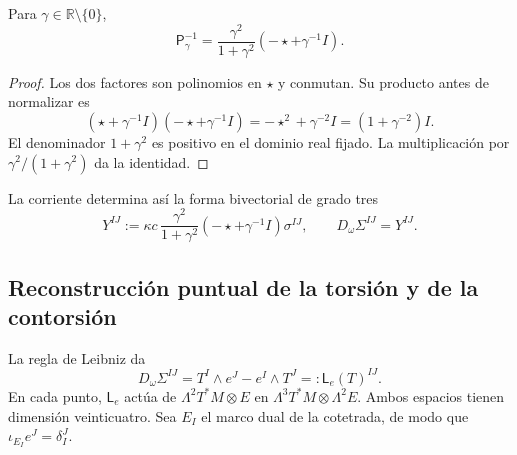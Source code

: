 \begin{lemma}
\label{vii:vii:lem:inversa-holst}
Para \(\gamma\in\mathbb R\setminus\{0\}\),
\begin{equation}
 \mathsf P_\gamma^{-1}
 =\frac{\gamma^2}{1+\gamma^2}
                      (-\star+\gamma^{-1}I).
 \label{vii:vii:eq:inversa-holst}
\end{equation}
\end{lemma}
\begin{proof}
Los dos factores son polinomios en \(\star\) y conmutan. Su producto
antes de normalizar es
\[
 (\star+\gamma^{-1}I)(-\star+\gamma^{-1}I)
 =-\star^2+\gamma^{-2}I=(1+\gamma^{-2})I.
\]
El denominador \(1+\gamma^2\) es positivo en el dominio real fijado.
La multiplicación por \(\gamma^2/(1+\gamma^2)\) da la identidad.
\end{proof}

La corriente determina así la forma bivectorial de grado tres
\begin{equation}
 Y^{IJ}:=\kappa c\,
   \frac{\gamma^2}{1+\gamma^2}
   (-\star+\gamma^{-1}I)\sigma^{IJ},
 \qquad D_\omega\Sigma^{IJ}=Y^{IJ}.
 \label{vii:vii:eq:corriente-dualizada}
\end{equation}

\subsection{Reconstrucción puntual de la torsión y de la contorsión}
\label{vii:vii:subsec:reconstruccion-torsion}

La regla de Leibniz da
\begin{equation}
 D_\omega\Sigma^{IJ}
 =T^I\wedge e^J-e^I\wedge T^J
 =:\mathsf L_e(T)^{IJ}.
 \label{vii:vii:eq:mapa-torsion}
\end{equation}
En cada punto, \(\mathsf L_e\) actúa de
\(\Lambda^2T^*M\otimes E\) en
\(\Lambda^3T^*M\otimes\Lambda^2E\). Ambos espacios tienen dimensión
veinticuatro. Sea \(E_I\) el marco dual de la cotetrada, de modo que
\(\iota_{E_I}e^J=\delta_I^J\).

